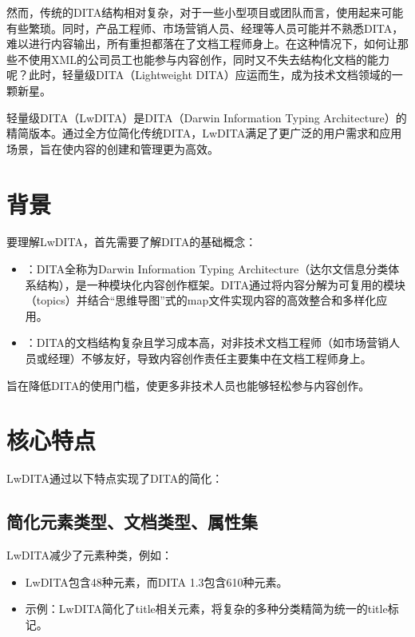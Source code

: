 \documentclass[letterpaper,10pt,english]{sphinxmanual}
\begin{document}
\sphinxAtStartPar
然而，传统的DITA结构相对复杂，对于一些小型项目或团队而言，使用起来可能有些繁琐。同时，产品工程师、市场营销人员、经理等人员可能并不熟悉DITA，难以进行内容输出，所有重担都落在了文档工程师身上。在这种情况下，如何让那些不使用XML的公司员工也能参与内容创作，同时又不失去结构化文档的能力呢？此时，轻量级DITA（Lightweight DITA）应运而生，成为技术文档领域的一颗新星。

\sphinxAtStartPar
轻量级DITA（LwDITA）是DITA（Darwin Information Typing Architecture）的精简版本。通过全方位简化传统DITA，LwDITA满足了更广泛的用户需求和应用场景，旨在使内容的创建和管理更为高效。


\section{背景}
\label{\detokenize{dita/lightweight-dita:id1}}
\sphinxAtStartPar
要理解LwDITA，首先需要了解DITA的基础概念：
\begin{itemize}
\item {} 
\sphinxAtStartPar
{}：DITA全称为Darwin Information Typing Architecture（达尔文信息分类体系结构），是一种模块化内容创作框架。DITA通过将内容分解为可复用的模块（topics）并结合“思维导图”式的map文件实现内容的高效整合和多样化应用。

\item {} 
\sphinxAtStartPar
{}：DITA的文档结构复杂且学习成本高，对非技术文档工程师（如市场营销人员或经理）不够友好，导致内容创作责任主要集中在文档工程师身上。

\end{itemize}

\sphinxAtStartPar
{}旨在降低DITA的使用门槛，使更多非技术人员也能够轻松参与内容创作。


\section{核心特点}
\label{\detokenize{dita/lightweight-dita:id2}}
\sphinxAtStartPar
LwDITA通过以下特点实现了DITA的简化：


\subsection{简化元素类型、文档类型、属性集}
\label{\detokenize{dita/lightweight-dita:id3}}
\sphinxAtStartPar
LwDITA减少了元素种类，例如：
\begin{itemize}
\item {} 
\sphinxAtStartPar
LwDITA包含48种元素，而DITA 1.3包含610种元素。

\item {} 
\sphinxAtStartPar
示例：LwDITA简化了title相关元素，将复杂的多种分类精简为统一的title标记。

\end{itemize}
\end{document}
